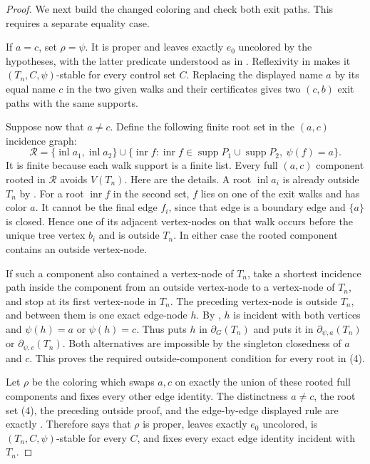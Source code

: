 \begin{proof}
We next build the changed coloring and check both exit paths.  This
requires a separate equality case.

If $a=c$, set $\rho=\psi$.  It is proper and leaves exactly $e_0$
uncolored by the hypotheses, with the latter predicate understood as in
.  Reflexivity in  makes it
$(T_n,C,\psi)$-stable for every control set $C$.  Replacing the displayed
name $a$ by its equal name $c$ in the two given walks and their
 certificates gives two $(c,b)$ exit paths with
the same supports.

Suppose now that $a\ne c$.  Define the following finite root set in the
$(a,c)$ incidence graph:
\[
 \mathcal R=\{\operatorname{inl}a_1,\operatorname{inl}a_2\}
 \mathbin\cup
 \{\operatorname{inr}f: \operatorname{inr}f\in
       \operatorname{supp}P_1\cup\operatorname{supp}P_2,
       \ \psi(f)=a\}.                              \tag{4}
\]
It is finite because each walk support is a finite list.  Every full
$(a,c)$ component rooted in $\mathcal R$ avoids $V(T_n)$.  Here are the
details.  A root $\operatorname{inl}a_i$ is already outside $T_n$ by
.  For a root $\operatorname{inr}f$ in the second
set, $f$ lies on one of the exit walks and has color $a$.  It cannot be
the final edge $f_i$, since that edge is a boundary edge and
$\{a\}$ is closed.  Hence one of its adjacent vertex-nodes on that walk
occurs before the unique tree vertex $b_i$ and is outside $T_n$.  In
either case the rooted component contains an outside vertex-node.

If such a component also contained a vertex-node of $T_n$, take a
shortest incidence path inside the component from an outside vertex-node
to a vertex-node of $T_n$, and stop at its first vertex-node in $T_n$.
The preceding vertex-node is outside $T_n$, and between them is one exact
edge-node $h$.  By , $h$ is incident
with both vertices and $\psi(h)=a$ or $\psi(h)=c$.
Thus  puts $h$ in $\partial_G(T_n)$ and
 puts it in
$\partial_{\psi,a}(T_n)$ or $\partial_{\psi,c}(T_n)$.  Both alternatives
are impossible by the singleton closedness of $a$ and $c$.  This proves
the required outside-component condition for every root in (4).

Let $\rho$ be the coloring which swaps $a,c$ on exactly the union of
these rooted full components and fixes every other edge identity.  The
distinctness $a\ne c$, the root set (4), the preceding outside proof, and
the edge-by-edge displayed rule are exactly
.  Therefore
 says that $\rho$ is proper, leaves
exactly $e_0$ uncolored, is $(T_n,C,\psi)$-stable for every $C$, and
fixes every exact edge identity incident with $T_n$.


\end{proof}

